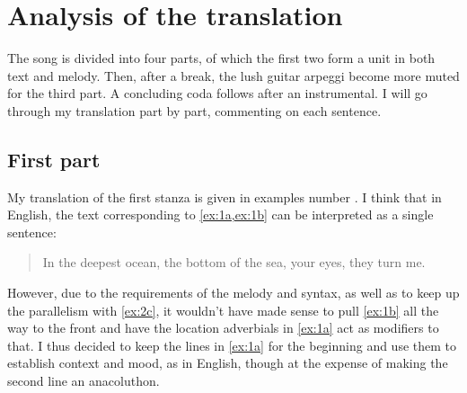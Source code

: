 \documentclass[12pt,paper=a4]{scrartcl}
\begin{document}
\begin{quote}


\end{quote}

\section{Analysis of the translation}

The song is divided into four parts, of which the first two form a unit in both
text and melody. Then, after a break, the lush guitar arpeggi become more muted
for the third part. A concluding coda follows after an instrumental. I will go
through my translation part by part, commenting on each sentence.

\subsection{First part}

My translation of the first stanza is given in examples number
. I think that in English, the text corresponding to
\cref{ex:1a,ex:1b} can be interpreted as a single sentence: \blockquote{In the
deepest ocean, the bottom of the sea, your eyes, they turn me.} However, due to
the requirements of the melody and syntax, as well as to keep up the
parallelism with \cref{ex:2c}, it wouldn't have made sense to pull \cref{ex:1b}
all the way to the front and have the location adverbials in \cref{ex:1a} act
as modifiers to that. I thus decided to keep the lines in \cref{ex:1a} for the
beginning and use them to establish context and mood, as in English, though at
the expense of making the second line an anacoluthon.
\end{document}
